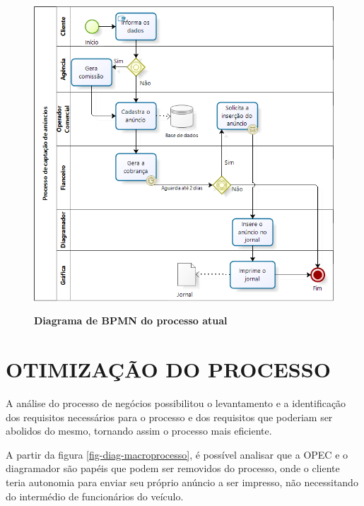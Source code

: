 \documentclass[
	12pt,				%
	openright,			%
	oneside,			%
	a4paper,			%
	chapter=TITLE,		%
	section=TITLE,		%
	english,			%
	french,				%
	spanish,			%
	brazil				%
	]{abntex2}
\begin{document}
\begin{figure}[h]
	\begin{center}
		\caption{
			\textbf{Diagrama de BPMN do processo atual}
		}\label{fig-bpmn-processo-atual}
		\includegraphics [scale=0.84]{imagens/bpmn_processo_atual.png}
		\label{fig-bpmn-processo-atual}
	\end{center}
\end{figure}


\section{OTIMIZAÇÃO DO PROCESSO}

A análise do processo de negócios possibilitou o levantamento e a identificação dos requisitos necessários para o processo e dos requisitos que poderiam ser abolidos do mesmo, tornando assim o processo mais eficiente.

A partir da figura \ref{fig-diag-macroprocesso}, é possível analisar que a OPEC e o diagramador são papéis que podem ser removidos do processo, onde o cliente teria autonomia para enviar seu próprio anúncio a ser impresso, não necessitando do intermédio de funcionários do veículo.
\end{document}
